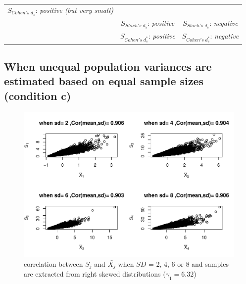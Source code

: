 \documentclass[
  english,
  man]{apa6}
\begin{document}
\begin{longtable}[]{@{}lcc@{}}
\begin{minipage}[t]{0.35\columnwidth}
\(S_{Cohen's \; d_s}\): \emph{positive (but very small)}\strut
\end{minipage}\tabularnewline
\begin{minipage}[t]{0.27\columnwidth}\raggedright
\strut
\end{minipage} & \begin{minipage}[t]{0.29\columnwidth}\centering
\(S_{Shieh's \; d_s}\): \emph{positive}\strut
\end{minipage} & \begin{minipage}[t]{0.35\columnwidth}\centering
\(S_{Shieh's \; d_s}\): \emph{negative}\strut
\end{minipage}\tabularnewline
\begin{minipage}[t]{0.27\columnwidth}\raggedright
\strut
\end{minipage} & \begin{minipage}[t]{0.29\columnwidth}\centering
\(S_{Cohen's \; d^*_s}\): \emph{positive}\strut
\end{minipage} & \begin{minipage}[t]{0.35\columnwidth}\centering
\(S_{Cohen's \; d^*_s}\): \emph{negative}\strut
\end{minipage}\tabularnewline
\bottomrule
\end{longtable}

\hypertarget{when-unequal-population-variances-are-estimated-based-on-equal-sample-sizes-condition-c}{%
\subsection{When unequal population variances are estimated based on equal sample sizes (condition c)}\label{when-unequal-population-variances-are-estimated-based-on-equal-sample-sizes-condition-c}}

\begin{figure}
\centering
\includegraphics{Correlation_files/figure-latex/Hetbalcorasafctofn1-1.pdf}
\caption{\label{fig:Hetbalcorasafctofn1}correlation between \(S_j\) and \(\bar{X_j}\) when \(SD\) = 2, 4, 6 or 8 and samples are extracted from right skewed distributions (\(\gamma_1 = 6.32\))}
\end{figure}
\end{document}
